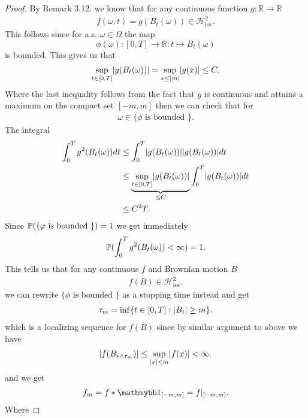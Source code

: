 \begin{proof}
By Remark 3.12. we know that for any continuous function $g : \mathbb{R} \to  \mathbb{R}$ 
\begin{align*}
  f(\omega ,t) = g(B_t(\omega )) \in  \mathcal{H}^{2}_{\text{loc}} 
.\end{align*}
This follows since for a.s. $\omega  \in  \Omega $ the map 
\[\phi(\omega ) : [0,T] \to  \mathbb{R} : t \mapsto B_t(\omega )\]
is bounded. This gives us that 
\begin{align*}
  \sup_{t \in  [0,T]} \abs{g(B_t(\omega ))} = \sup_{x \le \abs{m}} \abs{g(x)} \le  C
.\end{align*}
Where the last inequality follows from the fact that $g$ is continuous and attains a maximum on the compact set $[-m,m]$ then we can check that 
for 
\begin{align*}
  \omega  \in  \{\phi \text{ is bounded } \}  
.\end{align*}
The integral 
\begin{align*}
  \int_0^{T}  g^2(B_t(\omega )) dt &\le  \int_0^{T}  \abs{g(B_t(\omega ))}\abs{g(B_t(\omega ))} dt\\
                                   &\le  \underbrace{\sup_{t \in [0,T]} \abs{g(B_t(\omega ))}}_{\le C} \int_0^{T}  \abs{g(B_t(\omega ))} dt\\
                                   &\le  C^2T
.\end{align*}
Since $\P(\{\phi \text{ is bounded } \}) = 1$ we get  immediately 
\begin{align*}
  \P(\int_0^{T} g^2(B_t(\omega ))  < \infty) = 1
.\end{align*}
This tells us that  for any continuous $f$ and Brownian motion $B$ 
\begin{align*}
  f(B) \in  \mathcal{H}_{\text{loc}}^2
.\end{align*}
we can rewrite $\{\phi \text{ is bounded } \}$ as a stopping time instead and get 
\begin{align*}
  \tau_m = \inf \{t \in [0,T] :  \abs{B_t} \ge  m\}  
.\end{align*}
which is a localizing sequence for $f(B)$ since by similar argument to above we have 
\begin{align*}
  \abs{f(B_{* \land \tau_m})} \le  \sup_{\abs{x} \le m} \abs{f(x)} < \infty
.\end{align*}
and we get 
\begin{align*}
  f_m = f*\cha_{[-m,m]}  = f\rvert_{[-m,m]}
.\end{align*}
Where 

\end{proof}
